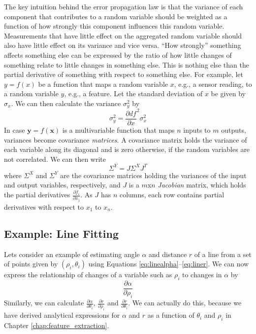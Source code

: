 The key intuition behind the error propagation law is that the variance of each component that contributes to a random variable should be weighted as a function of how strongly this component influences this random variable. Measurements that have little effect on the aggregated random variable should also have little effect on its variance and vice versa. ``How strongly'' something affects something else can be expressed by the ratio of how little changes of something relate to little changes in something else. This is nothing else than the partial derivative of something with respect to something else. For example, let $y=f(x)$ be a function that maps a random variable $x$, e.g., a sensor reading, to a random variable $y$, e.g., a feature. Let the standard deviation of $x$ be given by $\sigma_x$. We can then calculate the variance $\sigma_y^2$ by 
\begin{equation}
\sigma_y^2=\frac{\partial df}{\partial x}^2 \sigma_x^2
\end{equation}
In case $\mathbf{y}=f(\mathbf{x})$ is a multivariable function that maps $n$ inputs to $m$ outputs, variances become covariance \emph{matrices}. A covariance matrix holds the variance of each variable along its diagonal and is zero otherwise, if the random variables are not correlated. We can then write
\begin{equation}
\Sigma^Y= J \Sigma^X J^T
\end{equation}
where $\Sigma^X$ and $\Sigma^Y$ are the covariance matrices holding the variances of the input and output variables, respectively, and $J$ is a $m$x$n$ \emph{Jacobian} matrix, which holds the partial derivatives $\frac{\partial f_i}{\partial x_j}$. As $J$ has $n$ columns, each row contains partial derivatives with respect to $x_1$ to $x_n$.

\subsection{Example: Line Fitting}\label{sec:linefitting}
Lets consider an example of estimating angle $ \alpha$ and distance $ r$ of a line from a set of points given by $ (\rho_i,\theta_i)$ using Equations \ref{eq:linealpha}--\ref{eq:liner}. We can now express the relationship of changes of a variable such as $ \rho_i$ to changes in $ \alpha$ by
\begin{equation}
\frac{\partial \alpha}{\partial \rho_i}
\end{equation}
Similarly, we can calculate $ \frac{\partial \alpha}{\partial \theta_i}$, $ \frac{\partial r}{\partial \rho_i}$ and $ \frac{\partial r}{\partial \theta_i}$. We can actually do this, because we have derived analytical expressions for $ \alpha$ and $ r$ as a function of $ \theta_i$ and $ \rho_i$ in Chapter \ref{chap:feature_extraction}.


